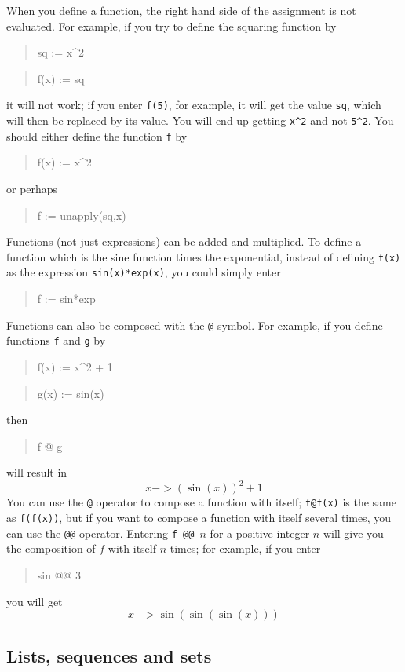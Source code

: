 \documentclass{article}
\newcommand{\xcasin}[1]
{\begin{quote}\ttfamily
#1
\end{quote}}
\newcommand{\xcasout}[1]
{\begin{equation*}
#1
\end{equation*}}
\begin{document}
When you define a function, the right hand side of the assignment is
not evaluated.  For example, if you try to define the squaring
function by
\xcasin{sq := x\^{}2}
\xcasin{f(x) := sq}
it will not work; if you enter \texttt{f(5)}, for example, it will
get the value \texttt{sq}, which will then be replaced by its value.
You will end up getting \texttt{x\^{}2} and not \texttt{5\^{}2}.  You
should either define the function \texttt{f} by
\xcasin{f(x) := x\^{}2}
or perhaps
\xcasin{f := unapply(sq,x)}

Functions (not just expressions) can be added and multiplied.  To
define a function which is the sine function times the exponential,
instead of defining \texttt{f(x)} as the expression
\texttt{sin(x)*exp(x)}, you could simply enter
\xcasin{f := sin*exp}
Functions can also be composed with the \texttt{@} symbol.  For example, if
you define functions \texttt{f} and \texttt{g} by
\xcasin{f(x) := x\^{}2 + 1}
\xcasin{g(x) := sin(x)}
then 
\xcasin{f @ g}
will result in
\xcasout{x ->(\sin(x))^2 + 1}
You can use the \texttt{@} operator to compose a function with itself;
\texttt{f@f(x)} is the same as \texttt{f(f(x))}, but if you want to
compose a function with itself several times, you can use the
\texttt{@@} operator.  Entering \texttt{f @@ }$n$ for a positive
integer $n$ will give you the composition of $f$ with itself $n$
times; for example, if you enter
\xcasin{sin @@ 3}
you will get
\xcasout{x -> \sin(\sin(\sin(x)))}


\subsection{Lists, sequences and sets}
\label{lists}
\end{document}
